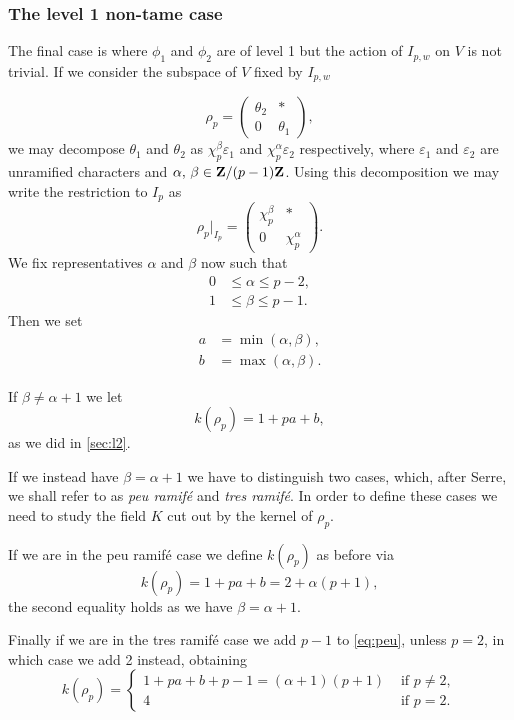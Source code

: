 \documentclass[a4paper,12pt]{article}
\begin{document}
\subsubsection{The level 1 non-tame case}\label{sec:l1nt}
The final case is where $\phi_1$ and $\phi_2$ are of level 1 but the action of $I_{p,w}$ on $V$ is not trivial.
If we consider the subspace of $V$ fixed by $I_{p,w}$

\[
\rho_p = \begin{pmatrix}
\theta_2 & * \\
0        & \theta_1 \end{pmatrix},
\]
we may decompose $\theta_1$ and $\theta_2$ as $\chi_p^\beta \varepsilon_1$ and $\chi_p^\alpha \varepsilon_2$ respectively, where $\varepsilon_1$ and $\varepsilon_2$ are unramified characters and $\alpha,\,\beta \in \mathbf{Z}/(p-1)\mathbf{Z}$.
Using this decomposition we may write the restriction to $I_p$ as
\[
\rho_p|_{I_p} = \begin{pmatrix}
\chi_p^\beta & * \\
0          & \chi_p^\alpha \end{pmatrix}.
\]
We fix representatives $\alpha$ and $\beta$ now such that
\begin{align*}
0&\le \alpha \le p - 2,\\
1&\le \beta \le p - 1.
\end{align*}
Then we set
\begin{align*}
a &= \min(\alpha, \beta),\\
b &= \max(\alpha, \beta).
\end{align*}

If $\beta \ne \alpha + 1$ we let
\begin{equation}\label{eq:l1nt}
k(\rho_p) = 1 + pa + b,
\end{equation}
as we did in \cref{sec:l2}.

If we instead have $\beta = \alpha + 1$ we have to distinguish two cases, which, after Serre, we shall refer to as \emph{peu ramif\'e} and \emph{tres ramif\'e}.
In order to define these cases we need to study the field $K$ cut out by the kernel of $\rho_p$.

If we are in the peu ramif\'e case we define $k(\rho_p)$ as before via
\begin{equation}\label{eq:peu}
k(\rho_p) = 1 + pa + b = 2 + \alpha(p+1),
\end{equation}
the second equality holds as we have $\beta = \alpha + 1$.

Finally if we are in the tres ramif\'e case we add $p-1$ to \cref{eq:peu}, unless $p=2$, in which case we add 2 instead, obtaining
\begin{equation}\label{eq:tres}
k(\rho_p) = \begin{cases}
1 + pa + b + p - 1 = (\alpha + 1)(p+1) & \text{ if }p\ne 2,\\
4 & \text{ if } p = 2.
\end{cases}
\end{equation}
\end{document}
